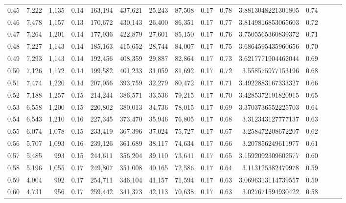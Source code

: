 \begin{tabular}{rrrrrrrrrrrrrrr}
0.45 &   7,222 &  1,135 &  0.14 &  163,194 &  437,621 &   25,243 &   87,508 &  0.17 &  0.78 &    3.8813048221301805 &      0.74 \\
0.46 &   7,478 &  1,157 &  0.13 &  170,672 &  430,143 &   26,400 &   86,351 &  0.17 &  0.77 &    3.8149816853065603 &      0.72 \\
0.47 &   7,264 &  1,201 &  0.14 &  177,936 &  422,879 &   27,601 &   85,150 &  0.17 &  0.76 &    3.7505565360839372 &      0.71 \\
0.48 &   7,227 &  1,143 &  0.14 &  185,163 &  415,652 &   28,744 &   84,007 &  0.17 &  0.75 &    3.6864595435960656 &      0.70 \\
0.49 &   7,293 &  1,143 &  0.14 &  192,456 &  408,359 &   29,887 &   82,864 &  0.17 &  0.73 &    3.6217771904462044 &      0.69 \\
0.50 &   7,126 &  1,172 &  0.14 &  199,582 &  401,233 &   31,059 &   81,692 &  0.17 &  0.72 &     3.558575977153196 &      0.68 \\
0.51 &   7,474 &  1,220 &  0.14 &  207,056 &  393,759 &   32,279 &   80,472 &  0.17 &  0.71 &    3.4922883167333327 &      0.66 \\
0.52 &   7,188 &  1,257 &  0.15 &  214,244 &  386,571 &   33,536 &   79,215 &  0.17 &  0.70 &    3.4285372191820915 &      0.65 \\
0.53 &   6,558 &  1,200 &  0.15 &  220,802 &  380,013 &   34,736 &   78,015 &  0.17 &  0.69 &    3.3703736552225703 &      0.64 \\
0.54 &   6,543 &  1,210 &  0.16 &  227,345 &  373,470 &   35,946 &   76,805 &  0.17 &  0.68 &     3.312343127777137 &      0.63 \\
0.55 &   6,074 &  1,078 &  0.15 &  233,419 &  367,396 &   37,024 &   75,727 &  0.17 &  0.67 &     3.258472208672207 &      0.62 \\
0.56 &   5,707 &  1,093 &  0.16 &  239,126 &  361,689 &   38,117 &   74,634 &  0.17 &  0.66 &     3.207856249611977 &      0.61 \\
0.57 &   5,485 &    993 &  0.15 &  244,611 &  356,204 &   39,110 &   73,641 &  0.17 &  0.65 &    3.1592092309602577 &      0.60 \\
0.58 &   5,196 &  1,055 &  0.17 &  249,807 &  351,008 &   40,165 &   72,586 &  0.17 &  0.64 &     3.113125382479978 &      0.59 \\
0.59 &   4,904 &    992 &  0.17 &  254,711 &  346,104 &   41,157 &   71,594 &  0.17 &  0.63 &    3.0696313114739557 &      0.59 \\
0.60 &   4,731 &    956 &  0.17 &  259,442 &  341,373 &   42,113 &   70,638 &  0.17 &  0.63 &     3.027671594930422 &      0.58 \\

\end{tabular}
